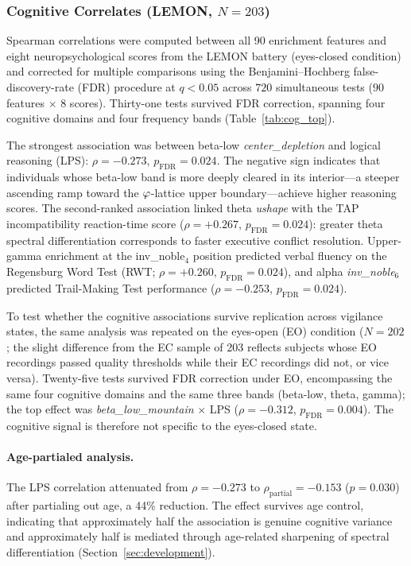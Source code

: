 \subsubsection{Cognitive Correlates (LEMON, $N = 203$)}
\label{sec:cognitive}

Spearman correlations were computed between all 90 enrichment features and eight neuropsychological scores from the LEMON battery (eyes-closed condition) and corrected for multiple comparisons using the Benjamini--Hochberg false-discovery-rate (FDR) procedure at $q < 0.05$ across $720$ simultaneous tests ($90$ features $\times$ $8$ scores). Thirty-one tests survived FDR correction, spanning four cognitive domains and four frequency bands (Table~\ref{tab:cog_top}).

The strongest association was between beta-low \textit{center\_depletion} and logical reasoning (LPS): $\rho = -0.273$, $p_\text{FDR} = 0.024$. The negative sign indicates that individuals whose beta-low band is more deeply cleared in its interior---a steeper ascending ramp toward the $\varphi$-lattice upper boundary---achieve higher reasoning scores. The second-ranked association linked theta \textit{ushape} with the TAP incompatibility reaction-time score ($\rho = +0.267$, $p_\text{FDR} = 0.024$): greater theta spectral differentiation corresponds to faster executive conflict resolution. Upper-gamma enrichment at the inv\_noble$_4$ position predicted verbal fluency on the Regensburg Word Test (RWT; $\rho = +0.260$, $p_\text{FDR} = 0.024$), and alpha \textit{inv\_noble$_6$} predicted Trail-Making Test performance ($\rho = -0.253$, $p_\text{FDR} = 0.024$).

To test whether the cognitive associations survive replication across vigilance states, the same analysis was repeated on the eyes-open (EO) condition ($N = 202$; the slight difference from the EC sample of 203 reflects subjects whose EO recordings passed quality thresholds while their EC recordings did not, or vice versa). Twenty-five tests survived FDR correction under EO, encompassing the same four cognitive domains and the same three bands (beta-low, theta, gamma); the top effect was \textit{beta\_low\_mountain} $\times$ LPS ($\rho = -0.312$, $p_\text{FDR} = 0.004$). The cognitive signal is therefore not specific to the eyes-closed state.

\paragraph{Age-partialed analysis.}
The LPS correlation attenuated from $\rho = -0.273$ to $\rho_\text{partial} = -0.153$ ($p = 0.030$) after partialing out age, a 44\% reduction. The effect survives age control, indicating that approximately half the association is genuine cognitive variance and approximately half is mediated through age-related sharpening of spectral differentiation (Section~\ref{sec:development}).

